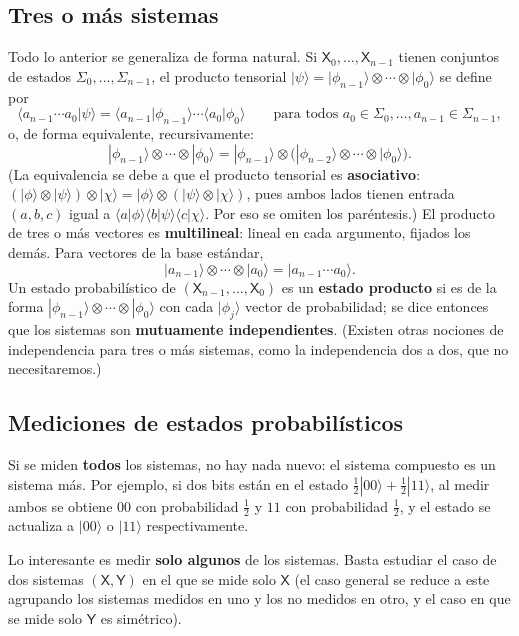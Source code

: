 \documentclass[11pt, a4paper, twoside, openright]{report}
\begin{document}
\subsection{Tres o más sistemas}

\noindent Todo lo anterior se generaliza de forma natural. Si $\mathsf{X}_0, \dots, \mathsf{X}_{n-1}$ tienen conjuntos de estados $\Sigma_0, \dots, \Sigma_{n-1}$, el producto tensorial $|\psi\rangle = |\phi_{n-1}\rangle\otimes\cdots\otimes|\phi_0\rangle$ se define por
\[ \langle a_{n-1}\cdots a_0|\psi\rangle = \langle a_{n-1}|\phi_{n-1}\rangle\cdots\langle a_0|\phi_0\rangle \qquad \text{para todos } a_0\in\Sigma_0,\dots,a_{n-1}\in\Sigma_{n-1}, \]
o, de forma equivalente, recursivamente:
\[ |\phi_{n-1}\rangle\otimes\cdots\otimes|\phi_0\rangle = |\phi_{n-1}\rangle \otimes \big(|\phi_{n-2}\rangle\otimes\cdots\otimes|\phi_0\rangle\big). \]
(La equivalencia se debe a que el producto tensorial es \textbf{asociativo}: $(|\phi\rangle\otimes|\psi\rangle)\otimes|\chi\rangle = |\phi\rangle\otimes(|\psi\rangle\otimes|\chi\rangle)$, pues ambos lados tienen entrada $(a,b,c)$ igual a $\langle a|\phi\rangle\langle b|\psi\rangle\langle c|\chi\rangle$. Por eso se omiten los paréntesis.) El producto de tres o más vectores es \textbf{multilineal}: lineal en cada argumento, fijados los demás. Para vectores de la base estándar,
\[ |a_{n-1}\rangle\otimes\cdots\otimes|a_0\rangle = |a_{n-1}\cdots a_0\rangle. \]
Un estado probabilístico de $(\mathsf{X}_{n-1},\dots,\mathsf{X}_0)$ es un \textbf{estado producto} si es de la forma $|\phi_{n-1}\rangle\otimes\cdots\otimes|\phi_0\rangle$ con cada $|\phi_j\rangle$ vector de probabilidad; se dice entonces que los sistemas son \textbf{mutuamente independientes}. (Existen otras nociones de independencia para tres o más sistemas, como la independencia dos a dos, que no necesitaremos.)

\subsection{Mediciones de estados probabilísticos}

\noindent Si se miden \textbf{todos} los sistemas, no hay nada nuevo: el sistema compuesto es un sistema más. Por ejemplo, si dos bits están en el estado $\frac12|00\rangle + \frac12|11\rangle$, al medir ambos se obtiene $00$ con probabilidad $\frac12$ y $11$ con probabilidad $\frac12$, y el estado se actualiza a $|00\rangle$ o $|11\rangle$ respectivamente.

\noindent Lo interesante es medir \textbf{solo algunos} de los sistemas. Basta estudiar el caso de dos sistemas $(\mathsf{X},\mathsf{Y})$ en el que se mide solo $\mathsf{X}$ (el caso general se reduce a este agrupando los sistemas medidos en uno y los no medidos en otro, y el caso en que se mide solo $\mathsf{Y}$ es simétrico).
\end{document}
